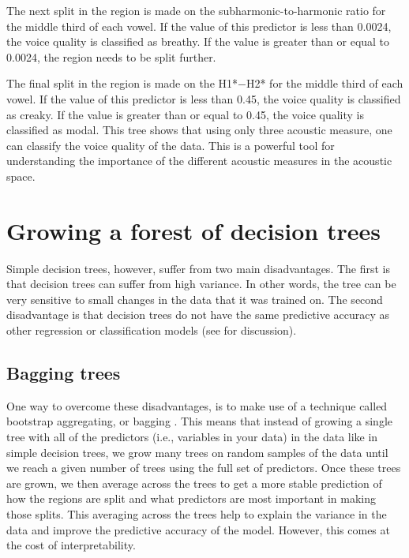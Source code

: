 The next split in the region is made on the subharmonic-to-harmonic ratio for the middle third of each vowel. If the value of this predictor is less than 0.0024, the voice quality is classified as breathy. If the value is greater than or equal to 0.0024, the region needs to be split further.

The final split in the region is made on the H1*$-$H2* for the middle third of each vowel. If the value of this predictor is less than 0.45, the voice quality is classified as creaky. If the value is greater than or equal to 0.45, the voice quality is classified as modal. This tree shows that using only three acoustic measure, one can classify the voice quality of the data. This is a powerful tool for understanding the importance of the different acoustic measures in the acoustic space. 

\section{Growing a forest of decision trees} \label{sec:growing_forest}

Simple decision trees, however, suffer from two main disadvantages. The first is that decision trees can suffer from high variance. In other words, the tree can be very sensitive to small changes in the data that it was trained on. The second disadvantage is that decision trees do not have the same predictive accuracy as other regression or classification models (see \cite{hastieElementsStatisticalLearning2009} for discussion).

\subsection{Bagging trees} \label{sec:bagging_bagging}
One way to overcome these disadvantages, is to make use of a technique called bootstrap aggregating, or bagging \citep{breimanBaggingPredictors1996}. This means that instead of growing a single tree with all of the predictors (i.e., variables in your data) in the data like in simple decision trees, we grow many trees on random samples of the data until we reach a given number of trees using the full set of predictors. Once these trees are grown, we then average across the trees to get a more stable prediction of how the regions are split and what predictors are most important in making those splits. This averaging across the trees help to explain the variance in the data and improve the predictive accuracy of the model. However, this comes at the cost of interpretability. 

